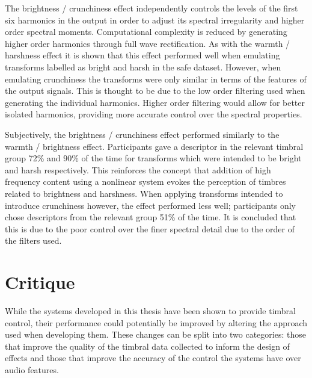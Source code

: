 	The brightness / crunchiness effect independently controls the levels of the first six harmonics in the output in
	order to adjust its spectral irregularity and higher order spectral moments. Computational complexity is reduced by
	generating higher order harmonics through full wave rectification. As with the warmth / harshness effect it is shown
	that this effect performed well when emulating transforms labelled as bright and harsh in the \acrshort{safe}
	dataset. However, when emulating crunchiness the transforms were only similar in terms of the features of the output
	signals. This is thought to be due to the low order filtering used when generating the individual harmonics. Higher
	order filtering would allow for better isolated harmonics, providing more accurate control over the spectral
	properties.

	Subjectively, the brightness / crunchiness effect performed similarly to the warmth / brightness effect.
	Participants gave a descriptor in the relevant timbral group 72\% and 90\% of the time for transforms which were
	intended to be bright and harsh respectively. This reinforces the concept that addition of high frequency content
	using a nonlinear system evokes the perception of timbres related to brightness and harshness. When applying
	transforms intended to introduce crunchiness however, the effect performed less well; participants only chose
	descriptors from the relevant group 51\% of the time. It is concluded that this is due to the poor control over the
	finer spectral detail due to the order of the filters used.

\section{Critique}
\label{sec:Conclusion-Critique}
	While the systems developed in this thesis have been shown to provide timbral control, their performance could
	potentially be improved by altering the approach used when developing them. These changes can be split into two
	categories: those that improve the quality of the timbral data collected to inform the design of effects and those
	that improve the accuracy of the control the systems have over audio features.

